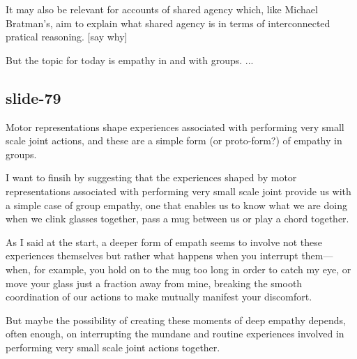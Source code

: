 \documentclass[12pt,\papersize]{extarticle}
\begin{document}
It may also be relevant for accounts of shared agency which, like Michael Bratman’s,
aim to explain what shared agency is in terms of interconnected pratical reasoning.
[say why]

But the topic for today is empathy in and with groups. ...

\subsection{slide-79}
Motor representations shape experiences
associated with performing very small scale joint actions,
and these are a
simple form (or proto-form?) of empathy in groups.

I want to finsih by suggesting that the experiences
shaped by motor representations
associated with performing very small scale joint provide us with a simple case
of group empathy, one that enables us to know what we are doing when we clink
glasses together, pass a mug between us or play a chord together.

As I said at the start, a deeper form of empath seems to involve not these experiences
themselves but rather what happens when you interrupt them---when, for example, you
hold on to the mug too long in order to catch my eye, or move your glass just a fraction
away from mine, breaking the smooth coordination of our actions to  make mutually manifest
your discomfort.

But maybe the possibility of creating these moments of deep empathy depends, often enough, on
interrupting the
mundane and routine experiences involved in performing very small scale joint actions together.


    











\end{document}
